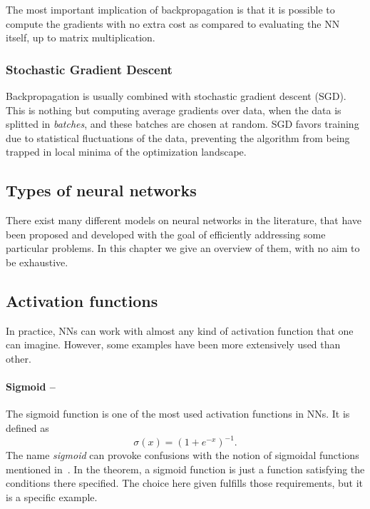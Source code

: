 \documentclass[]{report}
\begin{document}
The most important implication of backpropagation is that it is possible to compute the gradients with no extra cost as compared to evaluating the NN itself, up to matrix multiplication. 

\subsubsection{Stochastic Gradient Descent}

Backpropagation is usually combined with stochastic gradient descent (SGD). This is nothing but computing average gradients over data, when the data is splitted in \textit{batches}, and these batches are chosen at random. SGD favors training due to statistical fluctuations of the data, preventing the algorithm from being trapped in local minima of the optimization landscape. 

\subsection{Types of neural networks}

There exist many different models on neural networks in the literature, that have been proposed and developed with the goal of efficiently addressing some particular problems. In this chapter we give an overview of them, with no aim to be exhaustive. 

\subsection{Activation functions}

In practice, NNs can work with almost any kind of activation function that one can imagine. However, some examples have been more extensively used than other. 

\paragraph{Sigmoid --} The sigmoid function is one of the most used activation functions in NNs. It is defined as
\begin{equation}
\sigma(x) = (1 + e^{-x})^{-1}.
\end{equation}
The name \textit{sigmoid} can provoke confusions with the notion of sigmoidal functions mentioned in~. In the theorem, a sigmoid function is just a function satisfying the conditions there specified. The choice here given fulfills those requirements, but it is a specific example. 
\end{document}
